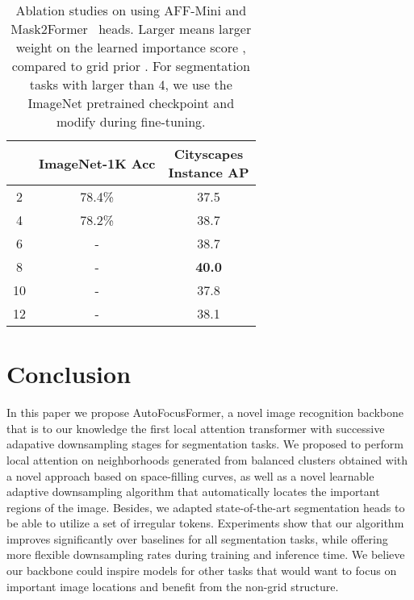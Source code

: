 \documentclass[10pt,twocolumn,letterpaper]{article}
\begin{document}
\begin{table}[htb]
\begin{center}
\begin{footnotesize}
\begin{tabular}{c|cc}
\makecell{} & ImageNet-1K Acc &\makecell{Cityscapes\\Instance AP}
\\\hline
2 & 78.4\% & 37.5 \\
4 & 78.2\% & 38.7 \\
6 & - & 38.7 \\
8 & - & \textbf{40.0} \\
10 & - & 37.8 \\
12 & - & 38.1 \\
\hline
\end{tabular}
\end{footnotesize}
\end{center}
\vspace{-0.6cm}
\caption{Ablation studies on  using AFF-Mini and Mask2Former~\cite{mask2} heads. Larger  means larger weight on the learned importance score ,  compared to grid prior . For segmentation tasks with  larger than 4, we use the  ImageNet pretrained checkpoint and modify  during fine-tuning. }
\label{tb:alpha}
\vskip -0.15in
\end{table}



\section{Conclusion}\label{sec:conclusion}
In this paper we propose AutoFocusFormer, a novel image recognition backbone that is to our knowledge the first local attention transformer with successive adapative downsampling stages for segmentation tasks. We proposed to perform local attention on neighborhoods generated from  balanced clusters obtained with a novel approach based on space-filling curves, as well as a novel learnable adaptive downsampling algorithm that automatically locates the important regions of the image. Besides, we adapted state-of-the-art segmentation heads to be able to utilize a set of irregular tokens. Experiments show that our algorithm improves significantly over baselines for all segmentation tasks, while offering more flexible downsampling rates during training and inference time. We believe our backbone could inspire models for other tasks that would want to focus on important image locations and benefit from the non-grid structure.
\vspace{-0.25in}
\end{document}
